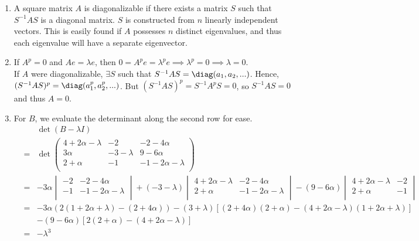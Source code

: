 \documentclass[a4paper]{article}
\begin{document}
\begin{ans}\leavevmode
\begin{enumerate}[label=(\alph*)]
\item A square matrix $A$ is diagonalizable if there exists a matrix $S$ such that $S^{-1}AS$ is a diagonal matrix. $S$ is constructed from $n$ linearly independent vectors. This is easily found if $A$ possesses $n$ distinct eigenvalues, and thus each eigenvalue will have a separate eigenvector.
\item If $A^p=0$ and $Ae=\lambda e$, then $0=A^pe=\lambda^pe\implies\lambda^p=0\implies\lambda=0$.\\[5pt]
If $A$ were diagonalizable, $\exists S$ such that $S^{-1}AS=\diag(a_1,a_2,...)$. Hence, $(S^{-1}AS)^p=\diag(a_1^p,a_2^p,...)$. But $(S^{-1}AS)^p=S^{-1}A^pS=0$, so $S^{-1}AS=0$ and thus $A=0$.
\item For $B$, we evaluate the determinant along the second row for ease.
\begin{eqnarray}
&&\det(B-\lambda I)\nonumber\\&=&\det\begin{pmatrix}4+2\alpha-\lambda&-2&-2-4\alpha\\3\alpha&-3-\lambda&9-6\alpha\\2+\alpha&-1&-1-2\alpha-\lambda\\\end{pmatrix}\nonumber\\&=&-3\alpha\begin{vmatrix}-2&-2-4\alpha\\-1&-1-2\alpha-\lambda\\\end{vmatrix}+(-3-\lambda)\begin{vmatrix}4+2\alpha-\lambda&-2-4\alpha\\2+\alpha&-1-2\alpha-\lambda\\\end{vmatrix}-(9-6\alpha)\begin{vmatrix}4+2\alpha-\lambda&-2\\2+\alpha&-1\\\end{vmatrix}\nonumber\nonumber\\&=&-3\alpha(2(1+2\alpha+\lambda)-(2+4\alpha))-(3+\lambda)[(2+4\alpha)(2+\alpha)-(4+2\alpha-\lambda)(1+2\alpha+\lambda)]\nonumber\\&&-(9-6\alpha)[2(2+\alpha)-(4+2\alpha-\lambda)]\nonumber\\&=&-\lambda^3\nonumber
\end{eqnarray}

\end{enumerate}
\end{ans}
\end{document}
